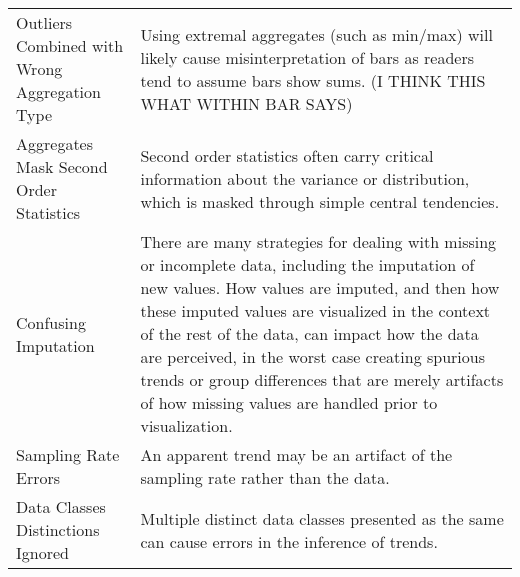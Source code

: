 \begin{longtable}{p{3cm}p{14cm}}
 \rowcolor{colorb-opaque}Outliers Combined with Wrong Aggregation Type & Using extremal aggregates (such as min/max) will likely cause misinterpretation of bars as readers tend to assume bars show sums. (I THINK THIS WHAT WITHIN BAR SAYS) \cite{newman2012bar}\\
 \rowcolor{colorb}Aggregates Mask Second Order Statistics & Second order statistics often carry critical information about the variance or distribution, which is masked through simple central tendencies.  \cite{wall2017warning, few2019loom, matejka2017same, anscombe1973graphs}\\
 \rowcolor{colorb-opaque}Confusing Imputation & There are many strategies for dealing with missing or incomplete data, including the imputation of new values. How values are imputed, and then how these imputed values are visualized in the context of the rest of the data, can impact how the data are perceived, in the worst case creating spurious trends or group differences that are merely artifacts of how missing values are handled prior to visualization. \cite{song2018s}\\
 \rowcolor{colorb}Sampling Rate Errors  & An apparent trend may be an artifact of the sampling rate rather than the data. \cite{kindlmann2014algebraic}\\
 \rowcolor{colorb-opaque}Data Classes Distinctions Ignored & Multiple distinct data classes presented as the same can cause errors in the inference of trends. \cite{anand2015automatic}\\


\end{longtable}
